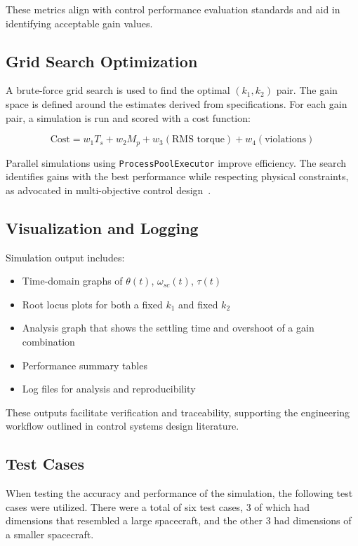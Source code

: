 \documentclass{ifacconf}
\begin{document}
These metrics align with control performance evaluation standards and aid in identifying acceptable gain values.

\subsection{Grid Search Optimization}

A brute-force grid search is used to find the optimal $(k_1, k_2)$ pair. The gain space is defined around the estimates derived from specifications. For each gain pair, a simulation is run and scored with a cost function:

\begin{equation}
\text{Cost} = w_1 T_s + w_2 M_p + w_3 (\text{RMS torque}) + w_4 (\text{violations})
\end{equation}

Parallel simulations using \texttt{ProcessPoolExecutor} improve efficiency. The search identifies gains with the best performance while respecting physical constraints, as advocated in multi-objective control design~\citep{Friedland2005}.

\subsection{Visualization and Logging}



Simulation output includes:

\begin{itemize}
  \item Time-domain graphs of $\theta(t)$, $\omega_{sc}(t)$, $\tau(t)$
  \item Root locus plots for both a fixed $k_1$ and fixed $k_2$
  \item Analysis graph that shows the settling time and overshoot of a gain combination
  \item Performance summary tables
  \item Log files for analysis and reproducibility
\end{itemize}

These outputs facilitate verification and traceability, supporting the engineering workflow outlined in control systems design literature.

\subsection{Test Cases}
When testing the accuracy and performance of the simulation, the following test cases were utilized. There were a total of six test cases, 3 of which had dimensions that resembled a large spacecraft, and the other 3 had dimensions of a smaller spacecraft. 
\end{document}
